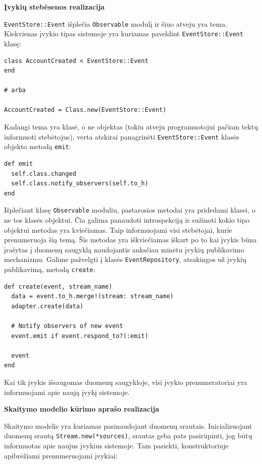 \textbf{Įvykių stebėsenos realizacija}

\lstinline|EventStore::Event| išplečia \lstinline|Observable| modulį ir šiuo atveju yra tema. Kiekvienas įvykio tipas sistemoje yra kuriamas paveldint \lstinline|EventStore::Event| klasę:

\begin{lstlisting}
class AccountCreated < EventStore::Event
end

# arba

AccountCreated = Class.new(EventStore::Event)
\end{lstlisting}

Kadangi tema yra klasė, o ne objektas (tokiu atveju programuotojui pačiam tektų informuoti stebėtojus), verta atskirai panagrinėti \lstinline|EventStore::Event| klasės objekto metodą \lstinline|emit|:

\begin{lstlisting}
def emit
  self.class.changed
  self.class.notify_observers(self.to_h)
end
\end{lstlisting}

Išplečiant klasę \lstinline|Observable| moduliu, pastarosios metodai yra pridedami klasei, o ne tos klasės objektui. Čia galima panaudoti introspekciją ir sužinoti kokio tipo objektui metodas yra kviečiamas. Taip informuojami visi stebėtojai, kurie prenumeruoja šią temą. Šis metodas yra iškviečiamas iškart po to kai įvykis būna įrašytas į duomenų saugyklą naudojantis anksčiau minėtu įvykių publikavimo mechanizmu. Galime pažvelgti į klasės \lstinline|EventRepository|, atsakingos už įvykių publikavimą, metodą \lstinline|create|:

\begin{lstlisting}
def create(event, stream_name)
  data = event.to_h.merge!(stream: stream_name)
  adapter.create(data)

  # Notify observers of new event
  event.emit if event.respond_to?(:emit)

  event
end
\end{lstlisting}

Kai tik įvykis išsaugomas duomenų saugykloje, visi įvykio prenumeratoriai yra informuojami apie naują įvykį sistemoje.

\textbf{Skaitymo modelio kūrimo aprašo realizacija}

Skaitymo modelis yra kuriamas pasinaudojant duomenų srautais. Inicializuojant duomenų srautą \lstinline|Stream.new(*sources)|, srautas geba pats pasirūpinti, jog būtų informuotas apie naujus įvykius sistemoje. Tam pasiekti, konstruktoriuje apibrėžiami prenumeruojami įvykiai:

